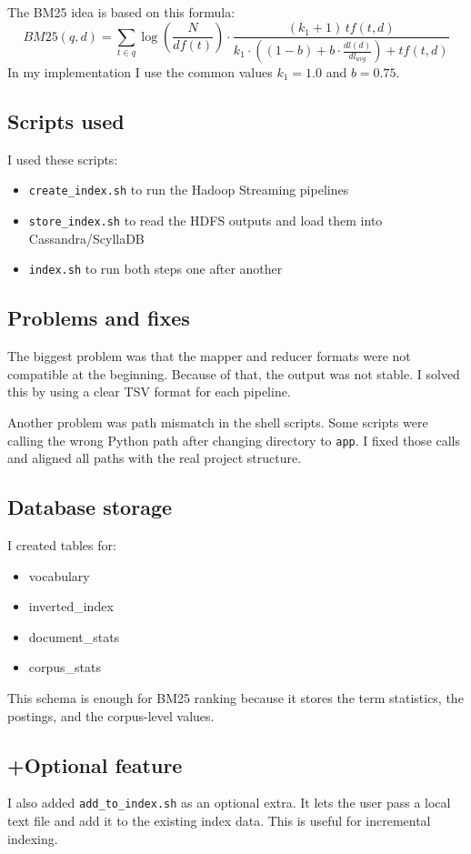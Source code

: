 \documentclass[12pt]{article}
\begin{document}
The BM25 idea is based on this formula:
\[
BM25(q,d)=\sum_{t \in q} \log\left(\frac{N}{df(t)}\right) \cdot \frac{(k_1+1)\,tf(t,d)}{k_1\cdot\left((1-b)+b\cdot\frac{dl(d)}{dl_{avg}}\right)+tf(t,d)}
\]
In my implementation I use the common values \(k_1=1.0\) and \(b=0.75\).

\subsection{Scripts used}
I used these scripts:
\begin{itemize}
    \item \texttt{create\_index.sh} to run the Hadoop Streaming pipelines
    \item \texttt{store\_index.sh} to read the HDFS outputs and load them into Cassandra/ScyllaDB
    \item \texttt{index.sh} to run both steps one after another
\end{itemize}

\subsection{Problems and fixes}
The biggest problem was that the mapper and reducer formats were not compatible at the beginning. Because of that, the output was not stable. I solved this by using a clear TSV format for each pipeline.

Another problem was path mismatch in the shell scripts. Some scripts were calling the wrong Python path after changing directory to \texttt{app}. I fixed those calls and aligned all paths with the real project structure.

\subsection{Database storage}
I created tables for:
\begin{itemize}
    \item vocabulary
    \item inverted\_index
    \item document\_stats
    \item corpus\_stats
\end{itemize}

This schema is enough for BM25 ranking because it stores the term statistics, the postings, and the corpus-level values.

\subsection{+Optional feature}
I also added \texttt{add\_to\_index.sh} as an optional extra. It lets the user pass a local text file and add it to the existing index data. This is useful for incremental indexing.
\end{document}
